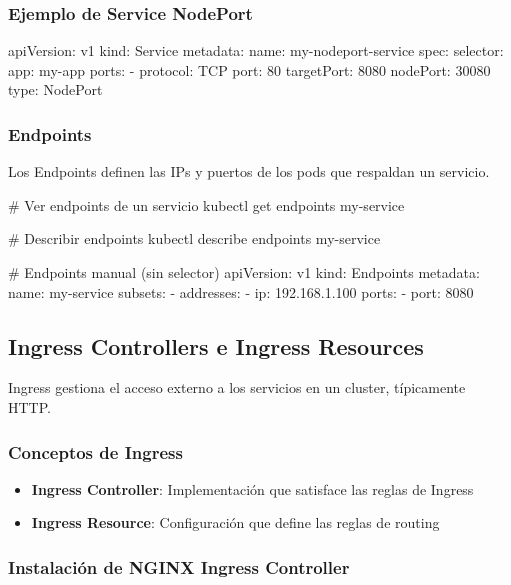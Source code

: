\documentclass[11pt,a4paper]{article}
\begin{document}
\subsubsection{Ejemplo de Service NodePort}

\begin{commandbox}
apiVersion: v1
kind: Service
metadata:
  name: my-nodeport-service
spec:
  selector:
    app: my-app
  ports:
    - protocol: TCP
      port: 80
      targetPort: 8080
      nodePort: 30080
  type: NodePort
\end{commandbox}

\subsubsection{Endpoints}

Los Endpoints definen las IPs y puertos de los pods que respaldan un servicio.

\begin{commandbox}
\# Ver endpoints de un servicio
kubectl get endpoints my-service

\# Describir endpoints
kubectl describe endpoints my-service

\# Endpoints manual (sin selector)
apiVersion: v1
kind: Endpoints
metadata:
  name: my-service
subsets:
  - addresses:
      - ip: 192.168.1.100
    ports:
      - port: 8080
\end{commandbox}

\subsection{Ingress Controllers e Ingress Resources}

Ingress gestiona el acceso externo a los servicios en un cluster, típicamente HTTP.

\subsubsection{Conceptos de Ingress}

\begin{itemize}
    \item \textbf{Ingress Controller}: Implementación que satisface las reglas de Ingress
    \item \textbf{Ingress Resource}: Configuración que define las reglas de routing
\end{itemize}

\subsubsection{Instalación de NGINX Ingress Controller}
\end{document}
